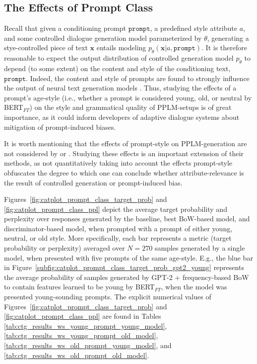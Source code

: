 \subsection{The Effects of Prompt Class }
\label{subsec:ctg_anal_prompt_class}

Recall that given a conditioning prompt $\texttt{prompt}$, a predefined style attribute $a$, and some controlled dialogue generation model parameterized by $\theta$, generating a stye-controlled piece of text $\textbf{x}$ entails modeling $p_{\theta}(\textbf{x} | a, \texttt{prompt})$. It is therefore reasonable to expect the output distribution of controlled generation model $p_{\theta}$ to depend (to some extent) on the content and style of the conditioning text, $\texttt{prompt}$. Indeed, the content and style of prompts are found to strongly influence the output of neural text generation models \citep{fan-etal-2018-hierarchical, lester2021power}. Thus, studying the effects of a prompt's age-style (i.e., whether a prompt is considered young, old, or neutral by BERT$_{FT}$) on the style and grammatical quality of PPLM-setups is of great importance, as it could inform developers of adaptive dialogue systems about mitigation of prompt-induced biases.

It is worth mentioning that the effects of prompt-style on PPLM-generation are not considered by \cite{dathathri2019plug} or \cite{madotto-etal-2020-plug}. Studying these effects is an important extension of their methods, as not quantitatively taking into account the effects prompt-style obfuscates the degree to which one can conclude whether attribute-relevance is the result of controlled generation or prompt-induced bias.

Figures~\ref{fig:catplot_prompt_class_target_prob} and \ref{fig:catplot_prompt_class_ppl} depict the average target probability and perplexity over responses generated by the baseline, best BoW-based model, and discriminator-based model, when prompted with a prompt of either young, neutral, or old style. More specifically, each bar represents a metric (target probability or perplexity) averaged over $N=270$ samples generated by a single model, when presented with five prompts of the same age-style. E.g., the blue bar in Figure~\ref{subfig:catplot_prompt_class_target_prob_gpt2_young} represents the average probability of samples generated by GPT-2 + frequency-based BoW to contain features learned to be young by BERT$_{FT}$, when the model was presented young-sounding prompts. The explicit numerical values of Figures~\ref{fig:catplot_prompt_class_target_prob} and \ref{fig:catplot_prompt_class_ppl} are found in Tables \ref{tab:ctg_results_ws_young_prompt_young_model}, \ref{tab:ctg_results_ws_young_prompt_old_model}, \ref{tab:ctg_results_ws_old_prompt_young_model}, and \ref{tab:ctg_results_ws_old_prompt_old_model}.

